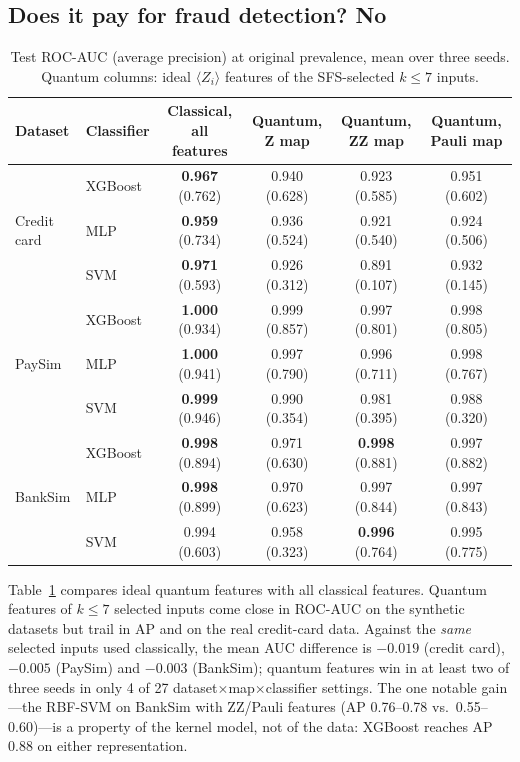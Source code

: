 \documentclass[conference,compsoc]{IEEEtran}
\newcommand{\ev}[1]{\langle #1\rangle}
\begin{document}
\subsection{Does it pay for fraud detection? No}
\begin{table}[t]
\centering
\caption{Test ROC-AUC (average precision) at original prevalence, mean over three seeds. Quantum columns: ideal $\ev{Z_i}$ features of the SFS-selected $k\le7$ inputs.}
\label{tab:main}
\scriptsize
\begin{tabular}{llcccc}
\toprule
Dataset & Classifier & Classical, all features & Quantum, Z map & Quantum, ZZ map & Quantum, Pauli map\\
\midrule
\multirow{3}{*}{Credit card} & XGBoost & \textbf{0.967} (0.762) & 0.940 (0.628) & 0.923 (0.585) & 0.951 (0.602)\\
 & MLP & \textbf{0.959} (0.734) & 0.936 (0.524) & 0.921 (0.540) & 0.924 (0.506)\\
 & SVM & \textbf{0.971} (0.593) & 0.926 (0.312) & 0.891 (0.107) & 0.932 (0.145)\\
\midrule
\multirow{3}{*}{PaySim} & XGBoost & \textbf{1.000} (0.934) & 0.999 (0.857) & 0.997 (0.801) & 0.998 (0.805)\\
 & MLP & \textbf{1.000} (0.941) & 0.997 (0.790) & 0.996 (0.711) & 0.998 (0.767)\\
 & SVM & \textbf{0.999} (0.946) & 0.990 (0.354) & 0.981 (0.395) & 0.988 (0.320)\\
\midrule
\multirow{3}{*}{BankSim} & XGBoost & \textbf{0.998} (0.894) & 0.971 (0.630) & \textbf{0.998} (0.881) & 0.997 (0.882)\\
 & MLP & \textbf{0.998} (0.899) & 0.970 (0.623) & 0.997 (0.844) & 0.997 (0.843)\\
 & SVM & 0.994 (0.603) & 0.958 (0.323) & \textbf{0.996} (0.764) & 0.995 (0.775)\\
\bottomrule
\end{tabular}
\end{table}

Table~\ref{tab:main} compares ideal quantum features with all classical features. Quantum features of $k\le7$ selected inputs come close in ROC-AUC on the synthetic datasets but trail in AP and on the real credit-card data. Against the \emph{same} selected inputs used classically, the mean AUC difference is $-0.019$ (credit card), $-0.005$ (PaySim) and $-0.003$ (BankSim); quantum features win in at least two of three seeds in only 4 of 27 dataset$\times$map$\times$classifier settings. The one notable gain---the RBF-SVM on BankSim with ZZ/Pauli features (AP 0.76--0.78 vs.\ 0.55--0.60)---is a property of the kernel model, not of the data: XGBoost reaches AP 0.88 on either representation.
\end{document}
